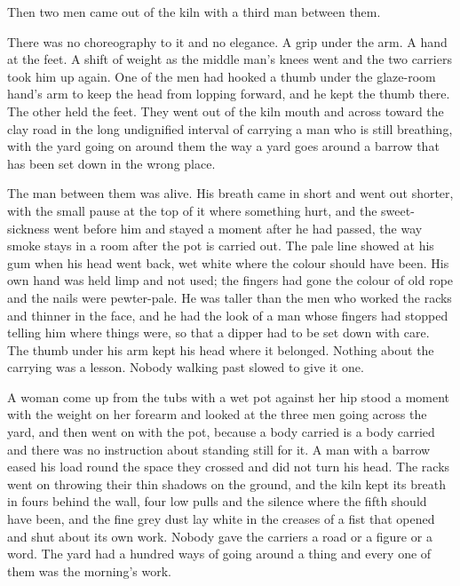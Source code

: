 \scenebreak

Then two men came out of the kiln with a third man between them.

There was no choreography to it and no elegance. A grip under the arm. A hand at the feet. A shift of weight as the middle man's knees went and the two carriers took him up again. One of the men had hooked a thumb under the glaze-room hand's arm to keep the head from lopping forward, and he kept the thumb there. The other held the feet. They went out of the kiln mouth and across  toward the clay road in the long undignified interval of carrying a man who is still breathing, with the yard going on around them the way a yard goes around a barrow that has been set down in the wrong place.

The man between them was alive. His breath came in short and went out shorter, with the small pause at the top of it where something hurt, and the sweet-sickness went before him and stayed a moment after he had passed, the way smoke stays in a room after the pot is carried out. The pale line showed at his gum when his head went back, wet white where the colour should have been. His own hand was held limp and not used; the fingers had gone the colour of old rope and the nails were pewter-pale. He was taller than the men who worked the racks and thinner in the face, and he had the look of a man whose fingers had stopped telling him where things were, so that a dipper had to be set down with care. The thumb under his arm kept his head where it belonged. Nothing about the carrying was a lesson. Nobody walking past slowed to give it one.

A woman come up from the tubs with a wet pot against her hip stood a moment with the weight on her forearm and looked at the three men going across the yard, and then went on with the pot, because a body carried is a body carried and there was no instruction about standing still for it. A man with a barrow eased his load round the space they crossed and did not turn his head. The racks went on throwing their thin shadows on the ground, and the kiln kept its breath in fours behind the wall, four low pulls and the silence where the fifth should have been, and the fine grey dust lay white in the creases of a fist that opened and shut about its own work. Nobody gave the carriers a road or a figure or a word. The yard had a hundred ways of going around a thing and every one of them was the morning's work.

\scenebreak

